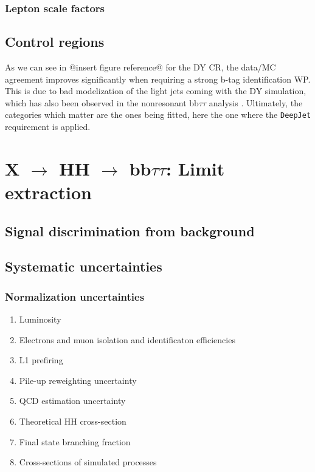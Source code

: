 \documentclass[11pt]{article}
\newcommand{\bbtt}{bb$\tau\tau$}
\newcommand{\reshhbbtt}{X $\rightarrow$ HH $\rightarrow$ bb$\tau\tau$}
\begin{document}
\subsubsection{Lepton scale factors}
\label{sec:org9f4098b}
\subsection{Control regions}
\label{sec:orgcf90c9f}
As we can see in @insert figure reference@ for the \ac{DY} \ac{CR}, the data/MC agreement improves significantly when requiring a strong b-tag identification \ac{WP}.
This is due to bad modelization of the light jets coming with the \ac{DY} simulation, which has also been observed in the nonresonant \bbtt{} analysis \cite{higgs_bbtautau_nonres}.
Ultimately, the categories which matter are the ones being fitted, here the one where the \texttt{DeepJet} requirement is applied.
\section{\reshhbbtt{}: Limit extraction}
\label{sec:org547ae33}
\subsection{Signal discrimination from background}
\label{sec:org92c86d2}
\subsection{Systematic uncertainties}
\label{sec:orga716958}
\subsubsection{Normalization uncertainties}
\label{sec:orgaad89fc}
\begin{enumerate}
\item Luminosity
\label{sec:org42aeb19}
\item Electrons and muon isolation and identificaton efficiencies
\label{sec:org3b1fdbc}
\item L1 prefiring
\label{sec:org6e3189c}
\item Pile-up reweighting uncertainty
\label{sec:orgf823b2a}
\item QCD estimation uncertainty
\label{sec:org079e030}
\item Theoretical HH cross-section
\label{sec:org099018c}
\item Final state branching fraction
\label{sec:org01df2d6}
\item Cross-sections of simulated processes
\label{sec:orgc45b761}
\end{enumerate}
\end{document}
